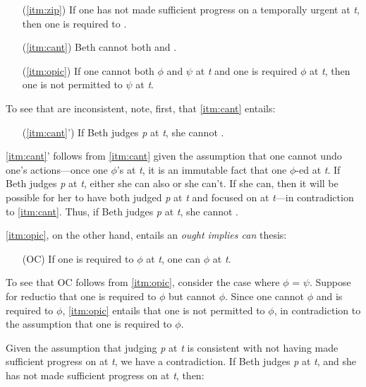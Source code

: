 \documentclass[12pt]{article}
\begin{document}
\begin{enumerate}
    \item[(\ref*{itm:zip})] If one has not made sufficient progress on a temporally urgent  at \textit{t}, then one is required to \foc{}.
    \item[(\ref*{itm:cant})] Beth cannot both \jud{} and \foc{}.
    \item[(\ref*{itm:opic})] If one cannot both $\phi$ and $\psi$ at \textit{t} and one is required $\phi$ at \textit{t}, then one is not permitted to $\psi$ at \textit{t}.
\end{enumerate}
%
To see that \psub{} are inconsistent, note, first, that \ref*{itm:cant} entails:

\begin{enumerate}
    \item[(\ref*{itm:cant}')] If Beth judges \textit{p} at \textit{t}, she cannot \foc{}.
\end{enumerate}
%
\ref*{itm:cant}' follows from \ref*{itm:cant} given the assumption that one cannot undo one's actions---once one $\phi$'s at \textit{t}, it is an immutable fact that one $\phi$-ed at \textit{t}. If Beth judges \textit{p} at \textit{t}, either she can also \foc{} or she can't. If she can, then it will be possible for her to have both judged \textit{p} at \textit{t} and focused on  at \textit{t}---in contradiction to \ref*{itm:cant}. Thus, if Beth judges \textit{p} at \textit{t}, she cannot \foc{}.

\ref*{itm:opic}, on the other hand, entails an \textit{ought implies can} thesis:

\begin{enumerate}
    \item[(OC)] If one is required to $\phi$ at \textit{t}, one can $\phi$ at \textit{t}.
\end{enumerate}
%
To see that OC follows from \ref*{itm:opic}, consider the case where $\phi$ = $\psi$. Suppose for reductio that one is required to $\phi$ but cannot $\phi$. Since one cannot $\phi$ and is required to $\phi$, \ref*{itm:opic} entails that one is not permitted to $\phi$, in contradiction to the assumption that one is required to $\phi$.

Given the assumption that judging \textit{p} at \textit{t} is consistent with not having made sufficient progress on  at \textit{t}, we have a contradiction. If Beth judges \textit{p} at \textit{t}, and she has not made sufficient progress on  at \textit{t}, then:
\end{document}
